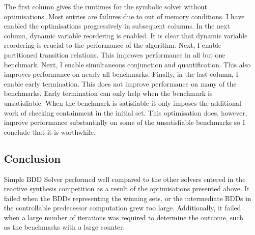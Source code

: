 The first column gives the runtimes for the symbolic solver without optimisations. Most entries are failures due to out of memory conditions. I have enabled the optimisations progressively in subsequent columns. In the next column, dynamic variable reordering is enabled. It is clear that dynamic variable reordering is crucial to the performance of the algorithm. Next, I enable partitioned transition relations. This improves performance in all but one benchmark. Next, I enable simultaneous conjunction and quantification. This also improves performance on nearly all benchmarks. Finally, in the last column, I enable early termination. This does not improve performance on many of the benchmarks. Early termination can only help when the benchmark is unsatisfiable. When the benchmark is satisfiable it only imposes the additional work of checking containment in the initial set. This optimisation does, however, improve performance substantially on some of the unsatisfiable benchmarks so I conclude that it is worthwhile.

\subsection{Conclusion}
Simple BDD Solver performed well compared to the other solvers entered in the reactive synthesis competition as a result of the optimisations presented above. It failed when the BDDs representing the winning sets, or the intermediate BDDs in the controllable predecessor computation grew too large. Additionally, it failed when a large number of iterations was required to determine the outcome, such as the benchmarks with a large counter. 

